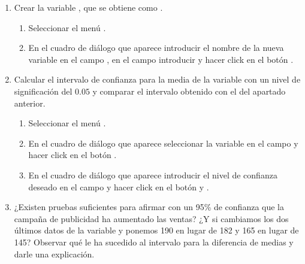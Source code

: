 \begin{enumerate}[leftmargin=*]
\begin{enumerate}
\item Crear la variable , que se obtiene como .
\begin{indicacion}
\begin{enumerate}
\item Seleccionar el menú .
\item En el cuadro de diálogo que aparece introducir el nombre de la nueva variable  en el campo
, en el campo  introducir  y hacer click en
el botón .
\end{enumerate}
\end{indicacion}

\item Calcular el intervalo de confianza para la media de la variable  con un nivel de
significación del $0.05$ y comparar el intervalo obtenido con el del apartado anterior.
\begin{indicacion}
\begin{enumerate}
\item Seleccionar el menú .
\item En el cuadro de diálogo que aparece seleccionar la variable  
en el campo  y hacer click en el botón .
\item En el cuadro de diálogo que aparece introducir el nivel de 
confianza deseado en el campo  y hacer click en el botón  y .
\end{enumerate}
\end{indicacion}

\item ¿Existen pruebas suficientes para afirmar con un 95\% de confianza que la campaña de publicidad ha aumentado las
ventas? ¿Y si cambiamos los dos últimos datos de la variable  y ponemos 190 en lugar de 182 y 165 en
lugar de 145? Observar qué le ha sucedido al intervalo para la diferencia de medias y darle una explicación.
\end{enumerate}



\end{enumerate}
